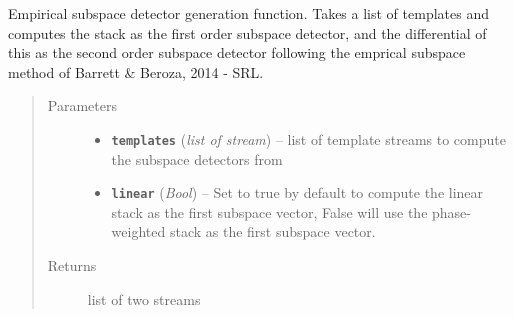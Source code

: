 \documentclass[a4paper,10pt,english]{sphinxmanual}
\begin{document}

\begin{fulllineitems}
\label{utils:clustering.empirical_SVD}
Empirical subspace detector generation function.  Takes a list of templates
and computes the stack as the first order subspace detector, and the
differential of this as the second order subspace detector following
the emprical subspace method of Barrett \& Beroza, 2014 - SRL.
\begin{quote}\begin{description}
\item[{Parameters}] \leavevmode\begin{itemize}
\item {} 
\textbf{\texttt{templates}} (\emph{list of stream}) -- list of template streams to compute the subspace detectors        from

\item {} 
\textbf{\texttt{linear}} (\emph{Bool}) -- Set to true by default to compute the linear stack as the        first subspace vector, False will use the phase-weighted stack as the        first subspace vector.

\end{itemize}

\item[{Returns}] \leavevmode
list of two streams

\end{description}\end{quote}

\end{fulllineitems}

\end{document}
